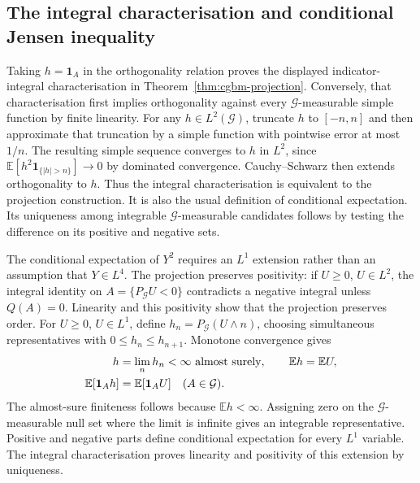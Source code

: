 \documentclass[11pt]{article}
\begin{document}
\subsection{The integral characterisation and conditional Jensen inequality}

Taking $h=\mathbf1_A$ in the orthogonality relation proves the displayed
indicator-integral characterisation in
Theorem~\ref{thm:cgbm-projection}. Conversely, that characterisation
first implies orthogonality against every $\mathcal G$-measurable
simple function by finite linearity. For any $h\in L^2(\mathcal G)$,
truncate $h$ to $[-n,n]$ and then approximate that truncation by a simple
function with pointwise error at most $1/n$. The resulting simple
sequence converges to $h$ in $L^2$, since
$\mathbb E[h^2\mathbf1_{\{|h|>n\}}]\to0$ by dominated convergence.
Cauchy--Schwarz then extends orthogonality to $h$. Thus the integral
characterisation is equivalent to the projection construction.
It is also the usual definition of conditional expectation. Its
uniqueness among integrable $\mathcal G$-measurable candidates follows
by testing the difference on its positive and negative sets.

The conditional expectation of $Y^2$ requires an $L^1$ extension rather
than an assumption that $Y\in L^4$. The projection preserves positivity:
if $U\geq0$, $U\in L^2$, the integral identity on
$A=\{P_{\mathcal G}U<0\}$ contradicts a negative integral unless
$Q(A)=0$. Linearity and this positivity show that the projection
preserves order. For $U\geq0$, $U\in L^1$, define
$h_n=P_{\mathcal G}(U\wedge n)$, choosing simultaneous representatives
with $0\leq h_n\leq h_{n+1}$. Monotone convergence gives
\begin{align}
 h&=\lim_nh_n<\infty\ \text{almost surely},\qquad
 \mathbb E h=\mathbb E U,\notag\\
 \mathbb E[\mathbf1_A h]&=\mathbb E[\mathbf1_A U]\quad(A\in\mathcal G).
 \label{eq:cgbm-conditional-l1}
\end{align}
The almost-sure finiteness follows because $\mathbb E h<\infty$.
Assigning zero on the $\mathcal G$-measurable null set where the limit
is infinite gives an integrable representative. Positive and negative
parts define conditional expectation for every $L^1$ variable. The
integral characterisation proves linearity and positivity of this
extension by uniqueness.
\end{document}
